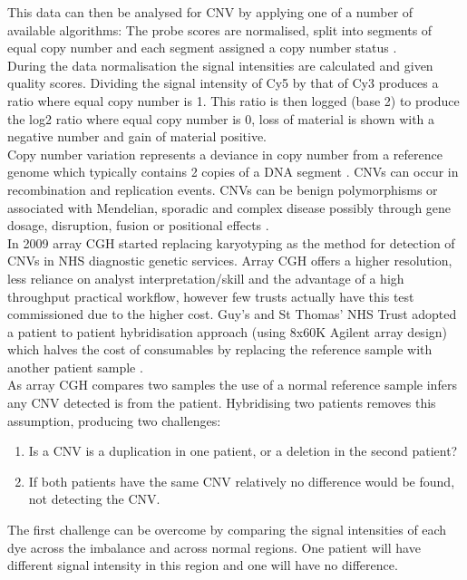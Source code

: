 This data can then be analysed for \ac{CNV} by applying one of a number of available algorithms:
 The probe scores are normalised, split into segments of equal copy number and each segment assigned a copy number status \citep{hupe2004}. \\

During the data normalisation the signal intensities are calculated and given quality scores. 
Dividing the signal intensity of Cy5 by that of Cy3 produces a ratio where equal
copy number is 1.
This ratio is then logged (base 2) to produce the log2 ratio where equal copy number is 0, loss of material is shown with a negative number and gain of material positive. \\

Copy number variation represents a deviance in copy number from a reference genome which typically contains 2 copies of a DNA segment \citep{roy2013}. 
\acp{CNV} can occur in recombination and replication events. \acp{CNV} can be benign polymorphisms or associated with Mendelian, sporadic and complex disease possibly through gene dosage, disruption, fusion or positional effects \citep{zhang2009}.\\

In 2009 array \ac{CGH} started replacing karyotyping as the method for detection of \acp{CNV} in NHS diagnostic genetic services. Array \ac{CGH} offers a higher resolution, less reliance on analyst interpretation/skill and the advantage of a high throughput practical workflow, however few trusts actually have this test commissioned due to the higher cost. Guy's and St Thomas' NHS Trust adopted a patient to patient hybridisation approach (using 8x60K Agilent array design) which halves the cost of consumables by replacing the reference sample with another patient sample \citep {ahn2010}.\\

As array \ac{CGH} compares two samples the use of a normal reference sample infers any \ac{CNV} detected is from the patient. Hybridising two patients removes this assumption, producing two challenges:
\begin{enumerate}
	\item Is a \ac{CNV} is a duplication in one patient, or a deletion in the second patient?
	\item If both patients have the same \ac{CNV} relatively no difference would be found, not detecting the \ac{CNV}.
\end{enumerate}	


The first challenge can be overcome by comparing the signal intensities of each dye across the imbalance and across normal regions. One patient will have different signal intensity in this region and one will have no difference.\\

